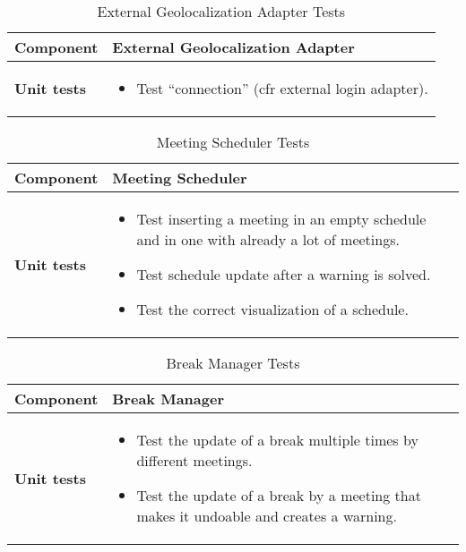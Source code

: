 \begin{table}[H]	
	\centering
	\def\arraystretch{1.5}
	\begin{tabular}{|m{4cm}|m{12cm}|}
		\hline
		\textbf{Component} & External Geolocalization Adapter \\ \hline
		\textbf{Unit tests} & 
			\begin{itemize}
			\item Test ``connection'' (cfr external login adapter).
			\end{itemize} \\ \hline
	\end{tabular}
	\caption{External Geolocalization Adapter Tests}
\end{table}

\begin{table}[H]	
	\centering
	\def\arraystretch{1.5}
	\begin{tabular}{|m{4cm}|m{12cm}|}
		\hline
		\textbf{Component} & Meeting Scheduler \\ \hline
		\textbf{Unit tests} & 
			\begin{itemize}
			\item Test inserting a meeting in an empty schedule and in one with already a lot of meetings.
			\item Test schedule update after a warning is solved.
			\item Test the correct visualization of a schedule.
			\end{itemize} \\ \hline
	\end{tabular}
	\caption{Meeting Scheduler Tests}
\end{table}

\begin{table}[H]	
	\centering
	\def\arraystretch{1.5}
	\begin{tabular}{|m{4cm}|m{12cm}|}
		\hline
		\textbf{Component} & Break Manager \\ \hline
		\textbf{Unit tests} & 
			\begin{itemize}
			\item Test the update of a break multiple times by different meetings.
			\item Test the update of a break by a meeting that makes it undoable and creates a warning.
			\end{itemize} \\ \hline
	\end{tabular}
	\caption{Break Manager Tests}
\end{table}


